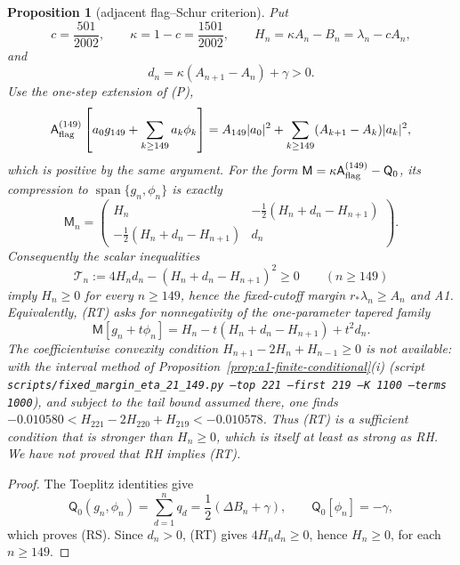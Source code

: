 \documentclass[11pt]{amsart}
\newtheorem{proposition}[theorem]{Proposition}
\theoremstyle{definition}
\theoremstyle{remark}
\theoremstyle{definition}
\begin{document}
\begin{proposition}[adjacent flag--Schur criterion]
\label{prop:a1-adjacent-schur}
Put
\[
 c=\frac{501}{2002},\qquad \kappa=1-c=\frac{1501}{2002},
 \qquad H_n=\kappa A_n-B_n=\lambda_n-cA_n,
\]
and
\[
 d_n=\kappa(A_{n+1}-A_n)+\gamma>0.
\]
Use the one-step extension of (P),
\[
 \mathsf A_{\rm flag}^{(149)}
 \left[a_0g_{149}+\sum_{k\ge149}a_k\phi_k\right]
 =A_{149}|a_0|^2+\sum_{k\ge149}(A_{k+1}-A_k)|a_k|^2,
\]
which is positive by the same argument.  For the form
$\mathsf M=\kappa\mathsf A_{\rm flag}^{(149)}-\mathsf Q_0$, its compression to
$\operatorname{span}\{g_n,\phi_n\}$ is exactly
\[
 \mathsf M_n=
 \begin{pmatrix}
 H_n&-\frac12(H_n+d_n-H_{n+1})\\
 -\frac12(H_n+d_n-H_{n+1})&d_n
 \end{pmatrix}.                                              \tag{RS}
\]
Consequently the scalar inequalities
\[
 \boxed{\quad
 \mathcal T_n:=4H_nd_n-(H_n+d_n-H_{n+1})^2\ge0
 \qquad(n\ge149)
 \quad}                                                       \tag{RT}
\]
imply $H_n\ge0$ for every $n\ge149$, hence the fixed-cutoff margin
$r_*\lambda_n\ge A_n$ and A1.  Equivalently, (RT) asks for nonnegativity of the one-parameter
tapered family
\[
 \mathsf M[g_n+t\phi_n]
 =H_n-t(H_n+d_n-H_{n+1})+t^2d_n.                             \tag{RU}
\]
The coefficientwise convexity condition
$H_{n+1}-2H_n+H_{n-1}\ge0$ is not available: with the interval method of
Proposition~\ref{prop:a1-finite-conditional}(i) (script
\texttt{scripts/fixed\_margin\_eta\_21\_149.py --top 221 --first 219 --K 1100 --terms 1000}), and
subject to the tail bound assumed there, one finds
$-0.010580<H_{221}-2H_{220}+H_{219}<-0.010578$.  Thus (RT) is a sufficient condition that is
stronger than $H_n\ge0$, which is itself at least as strong as RH.  We have
not proved that RH implies (RT).
\end{proposition}

\begin{proof}
The Toeplitz identities give
\[
 \mathsf Q_0(g_n,\phi_n)
 =\sum_{d=1}^nq_d=\frac12(\Delta B_n+\gamma),
 \qquad \mathsf Q_0[\phi_n]=-\gamma,
\]
which proves (RS).  Since $d_n>0$, (RT) gives $4H_nd_n\ge0$, hence $H_n\ge0$, for each
$n\ge149$.
\end{proof}
\end{document}
